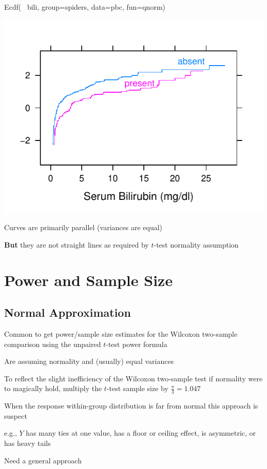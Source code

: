 \begin{Schunk}
\begin{Sinput}
Ecdf(~ bili, group=spiders, data=pbc, fun=qnorm)
\end{Sinput}


\centerline{\includegraphics[width=\maxwidth]{nonpar-pbc2-1} }

\end{Schunk}
\item Curves are primarily parallel (variances are equal)
\item \textbf{But} they are not straight lines as required by $t$-test normality assumption
\ei

\section{Power and Sample Size}
\subsection{Normal Approximation}
\bi
\item Common to get power/sample size estimates for the Wilcoxon two-sample comparison using the unpaired $t$-test power formula
\item Are assuming normality and (usually) equal variances
\item To reflect the slight inefficiency of the Wilcoxon two-sample test if normality were to magically hold, multiply the $t$-test sample size by $\frac{\pi}{3} = 1.047$
\item When the response within-group distribution is far from normal this approach is suspect
 \bi
 \item e.g., $Y$ has many ties at one value, has a floor or ceiling effect, is asymmetric, or has heavy tails
 \ei
\item Need a general approach
\ei

